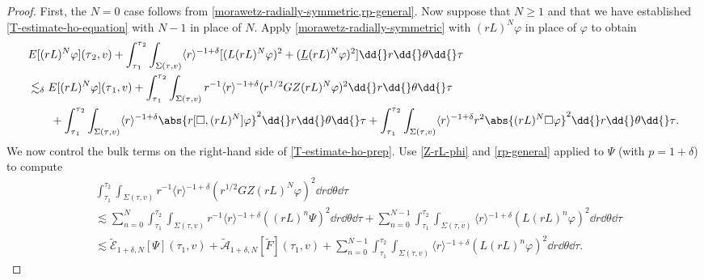 \documentclass[10pt, reqno]{amsart}
\begin{document}
\begin{proof}
First, the \(N=0\) case follows from \cref{morawetz-radially-symmetric,rp-general}. Now
suppose that \(N\ge 1\) and that we have established \cref{T-estimate-ho-equation}
with \(N-1\) in place of \(N\). Apply \cref{morawetz-radially-symmetric} with \((rL)^N\varphi{}\)
in place of \(\varphi{}\) to obtain
\begin{equation}\label{T-estimate-ho-prep}
\begin{split}
&E[(rL)^N\varphi{}](\tau{}_2,v) + \int_{\tau{}_1}^{\tau{}_2} \int _{\Sigma{}(\tau{},v)} \langle{}r\rangle{}^{-1+\delta{}}[(L(rL)^N\varphi{})^2 + (\underline{L}(rL)^N\varphi{})^2]\dd{}r\dd{}\theta{}\dd{}\tau{} \\
&\lesssim_\delta{} E[(rL)^N\varphi{}](\tau{}_1,v) + \int_{\tau{}_1}^{\tau{}_2} \int _{\Sigma{}(\tau{},v)} r^{-1}\langle{}r\rangle{}^{-1+\delta{}}(r^{1/2}GZ(rL)^N\varphi{})^2 \dd{}r\dd{}\theta{}\dd{}\tau{} \\
&\qquad + \int_{\tau{}_1}^{\tau{}_2} \int _{\Sigma{}(\tau{},v)} \langle{}r\rangle{}^{-1+\delta{}}\abs{r[\Box{},(rL)^N]\varphi{}}^2 \dd{}r\dd{}\theta{}\dd{}\tau{} + \int_{\tau{}_1}^{\tau{}_2} \int _{\Sigma{}(\tau{},v)} \langle{}r\rangle{}^{-1+\delta{}}r^2\abs{(rL)^N\Box{}\varphi{}}^2 \dd{}r\dd{}\theta{}\dd{}\tau{}.
\end{split}
\end{equation}
We now control the bulk terms on the right-hand side of \cref{T-estimate-ho-prep}. Use
\cref{Z-rL-phi} and \cref{rp-general} applied to \(\Psi{}\) (with \(p = 1 + \delta{}\)) to compute
\begin{equation}\label{T-estimate-ho-prep-1}
\begin{split}
&\int_{\tau{}_1}^{\tau{}_2} \int _{\Sigma{}(\tau{},v)} r^{-1}\langle{}r\rangle{}^{-1+\delta{}}(r^{1/2}GZ(rL)^N\varphi{})^2 \dd{}r\dd{}\theta{}\dd{}\tau{}\\
&\lesssim \sum_{n=0}^N\int_{\tau{}_1}^{\tau{}_2} \int _{\Sigma{}(\tau{},v)} r^{-1}\langle{}r\rangle{}^{-1+\delta{}}((rL)^n\Psi{})^2 \dd{}r\dd{}\theta{}\dd{}\tau{} + \sum_{n=0}^{N-1}\int_{\tau{}_1}^{\tau{}_2} \int _{\Sigma{}(\tau{},v)} \langle{}r\rangle{}^{-1+\delta{}}(L(rL)^n\varphi{})^2 \dd{}r\dd{}\theta{}\dd{}\tau{} \\
&\lesssim \tilde{\mathcal{E}}_{1+\delta{},N}[\Psi{}](\tau{}_1,v) +  \tilde{\mathcal{A}}_{1+\delta{},N}[\tilde{F}](\tau{}_1,v) + \sum_{n=0}^{N-1}\int_{\tau{}_1}^{\tau{}_2} \int _{\Sigma{}(\tau{},v)} \langle{}r\rangle{}^{-1+\delta{}}(L(rL)^n\varphi{})^2 \dd{}r\dd{}\theta{}\dd{}\tau{}.
\end{split}

\end{equation}
\end{proof}
\end{document}
